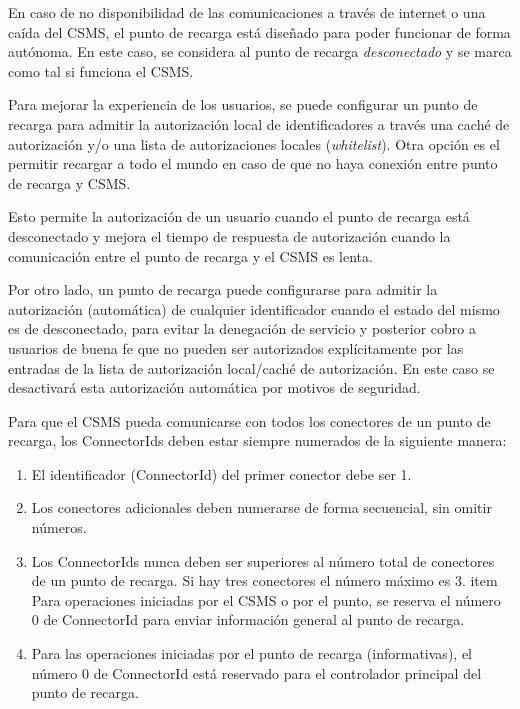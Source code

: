 \documentclass[12pt,a4paper,onecolumn,oneside]{report}
\newcounter{subsubsubsection}[subsubsection]
\begin{document}
En caso de no disponibilidad de las comunicaciones a través de internet o una caída del CSMS, el punto de recarga está diseñado para poder funcionar de forma autónoma. En este caso, se considera al punto de recarga \textit{desconectado} y se marca como tal si funciona el CSMS.

Para mejorar la experiencia de los usuarios, se puede configurar un punto de recarga para admitir la autorización local de identificadores a través una caché de autorización y/o una lista de autorizaciones locales (\textit{whitelist}). Otra opción es el permitir recargar a todo el mundo en caso de que no haya conexión entre punto de recarga y CSMS. 

Esto permite la autorización de un usuario cuando el punto de recarga está desconectado y mejora el tiempo de respuesta de autorización cuando la comunicación entre el punto de recarga y el CSMS es lenta.

Por otro lado, un punto de recarga puede configurarse para admitir la autorización (automática) de cualquier identificador cuando el estado del mismo es de desconectado, para evitar la denegación de servicio y posterior cobro a usuarios de buena fe que no pueden ser autorizados explícitamente por las entradas de la lista de autorización local/caché de autorización. En este caso se desactivará esta autorización automática por motivos de seguridad.


\label{Numeración de conectores}

Para que el CSMS pueda comunicarse con todos los conectores de un punto de recarga, los ConnectorIds deben estar siempre numerados de la siguiente manera:

\begin{enumerate}

\item El identificador (ConnectorId) del primer conector debe ser 1.
\item Los conectores adicionales deben numerarse de forma secuencial, sin omitir números.
\item Los ConnectorIds nunca deben ser superiores al número total de conectores de un punto de recarga. Si hay tres conectores el número máximo es 3.
item Para operaciones iniciadas por el CSMS o por el punto, se reserva el número 0 de ConnectorId para enviar información general al punto de recarga.
\item Para las operaciones iniciadas por el punto de recarga (informativas), el número 0 de ConnectorId está reservado para el controlador principal del punto de recarga.

\end{enumerate}
\end{document}

